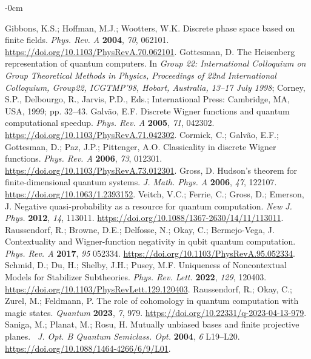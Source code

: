 \documentclass[quantumrep,article,accept,pdftex,moreauthors]{Definitions/mdpi}
\begin{document}
\begin{adjustwidth}{-\extralength}{0cm}
\begin{thebibliography}{999}
 Gibbons, K.S.; Hoffman, M.J.; Wootters, W.K. Discrete
phase space based on finite fields. \textit{Phys. Rev. A} \textbf{2004}, 
\textit{70}, 062101. \url{https://doi.org/10.1103/PhysRevA.70.062101}.
 Gottesman, D. The Heisenberg representation of quantum
computers. In \textit{Group 22: International Colloquium on Group
Theoretical Methods in Physics, Proceedings of 22nd International
Colloquium, Group22, ICGTMP'98, Hobart, Australia, 13--17 July 1998}; 
Corney, S.P., Delbourgo, R., Jarvis, P.D., Eds.; International Press: Cambridge,
MA, USA, 1999; pp. 32--43.
 Galv\~ao, E.F. Discrete Wigner functions and quantum
computational speedup. \textit{Phys. Rev. A} \textbf{2005}, \textit{71},
042302. \url{https://doi.org/10.1103/PhysRevA.71.042302}.
 Cormick, C.; Galvão, E.F.; Gottesman, D.; Paz, J.P.; Pittenger, A.O.
Classicality in discrete
Wigner functions. \textit{Phys. Rev. A} \textbf{2006}, \textit{73}, 012301.
\url{https://doi.org/10.1103/PhysRevA.73.012301}.
 Gross, D. Hudson's theorem for
finite-dimensional quantum systems. \textit{J. Math. Phys. A} \textbf{2006}, 
\textit{47}, 122107. \url{https://doi.org/10.1063/1.2393152}.
 Veitch, V.C.; Ferrie, C.; Gross, D.; Emerson,
J. Negative quasi-probability as a resource for quantum computation. \textit{New
J. Phys.} \textbf{2012}, \textit{14}, 113011.
\url{https://doi.org/10.1088/1367-2630/14/11/113011}.
 Raussendorf, R.; Browne, D.E.; Delfosse, N.; Okay, C.;
Bermejo-Vega, J. Contextuality and Wigner-function negativity in qubit
quantum computation. \textit{Phys. Rev. A} \textbf{2017}, \textit{95}
052334. \url{https://doi.org/10.1103/PhysRevA.95.052334}.
 Schmid, D.; Du, H.; Shelby, J.H.; Pusey, M.F.
Uniqueness of Noncontextual Models for Stabilizer Subtheories. \textit{Phys.
Rev. Lett.} \textbf{2022}, \textit{129}, 120403.
\url{https://doi.org/10.1103/PhysRevLett.129.120403}.
 Raussendorf, R.; Okay, C.; Zurel, M.; Feldmann, P. The role
of cohomology in quantum computation with magic states. \textit{Quantum} 
\textbf{2023}, \textit{7}, 979. \url{https://doi.org/10.22331/q-2023-04-13-979}.
 Saniga, M.; Planat, M.; Rosu, H. Mutually unbiased bases
and finite projective planes. \textit{\ J. Opt. B Quantum Semiclass. Opt.} 
\textbf{2004}, \textit{6} L19--L20. \url{https://doi.org/10.1088/1464-4266/6/9/L01}.

\end{thebibliography}
\end{adjustwidth}
\end{document}
